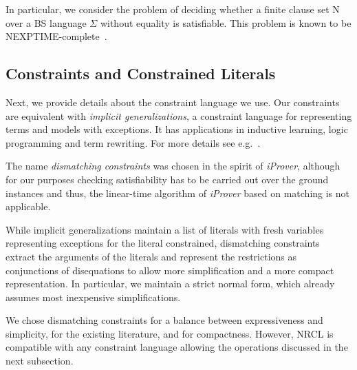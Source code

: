 \documentclass[a4paper]{article}
\newcommand{\mEPRs}{BS}
\begin{document}
In particular, we consider the problem of deciding whether a finite clause set $\text{N}$ over a {\mEPRs} language $\Sigma$ without equality is satisfiable. 
This problem is known to be NEXPTIME-complete~\cite{Lewis80}.

\subsection{Constraints and Constrained Literals}
Next, we provide details about the constraint language we use. Our constraints are equivalent with \emph{implicit generalizations}, a constraint language 
for representing terms and models with exceptions. 
It has applications in inductive learning, logic programming and term rewriting. 
For more details see e.g.\ 
\cite{Comon91}\cite{LassezM87}.

The name \emph{dismatching constraints} was chosen in the spirit of \emph{iProver}\cite{InstaGen13}, although for our purposes checking satisfiability 
has to be carried out over the ground instances and thus, the linear-time algorithm of \emph{iProver} based on matching is not applicable.

While implicit generalizations maintain a list of literals with fresh variables representing exceptions for the literal constrained, 
dismatching constraints extract the arguments of the literals and represent the restrictions as conjunctions of disequations to 
allow more simplification and a more compact representation.
In particular, we maintain a strict normal form, which already assumes most inexpensive simplifications.

We chose dismatching constraints for a balance between expressiveness and simplicity, for the existing literature, and for compactness. 
However, NRCL is compatible with any constraint language allowing the operations discussed in the next subsection.
\end{document}
